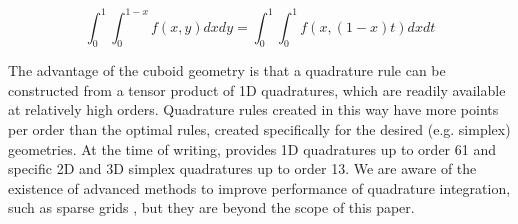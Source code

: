 \[ \int_0^1 \int_0^{1-x} f(x,y) dx dy = \int_0^1 \int_0^1 f(x, (1-x)t ) dx dt  \]

\noindent
The advantage of the cuboid geometry is that a quadrature rule can be constructed from a tensor product of 1D quadratures, which are readily available at relatively high orders. Quadrature rules created in this way have more points per order than the optimal rules, created specifically for the desired (e.g. simplex) geometries. At the time of writing, \dunegeom{} provides 1D quadratures up to order 61 and specific 2D and 3D simplex quadratures up to order 13. We are aware of the existence of advanced methods to improve performance of quadrature integration, such as sparse grids \cite{petras2000}, but they are beyond the scope of this paper. \\

